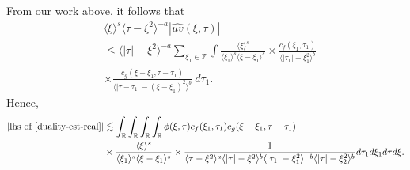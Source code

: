 \documentclass[12pt,reqno]{amsart}
\numberwithin{equation}{section}  %
\numberwithin{figure}{section}
\newcommand{\rr}{\mathbb{R}}
\newcommand{\zz}{\mathbb{Z}}
\newcommand{\wh}{\widehat}
\theoremstyle{plain}
\theoremstyle{definition}
\theoremstyle{remark}
\begin{document}
%
%
From our work above, it follows that 
%
%
\begin{equation}
	\label{convo-est-starting-pnt-real}
	\begin{split}
		 & \langle \xi \rangle^s \langle \tau - \xi^{2} \rangle^{-a} | \wh{uv}\left( 
		\xi, \tau \right) |
		\\
		& \le \langle |\tau| - \xi^{2} \rangle^{-a}
		\sum_{\xi_1 \in \zz} \int \frac{\langle \xi \rangle^{s}}{\langle \xi_1 \rangle^s
    \langle \xi - \xi_1 \rangle^s} 
		\times \frac{c_f(\xi_1, \tau_1)}{\langle |\tau_1| - \xi_1^{2} \rangle ^{b}}
		\\
		& \times
		\frac{c_g(\xi - \xi_1, \tau - \tau_1 )}{\langle |\tau - \tau_1| - (\xi - \xi_1)^{2}
    \rangle^{b}}\ d \tau_1.
	\end{split}
\end{equation}
%
%
Hence, 
%
%
\begin{equation}
  \label{pre-fubini-int-form-real}
	\begin{split}
    |\text{lhs of} \ \eqref{duality-est-real}|
    & \lesssim \int_{\rr} \int_{\rr}     \int_{\rr}  \int_{\rr} \phi(\xi, \tau)
    c_f(\xi_1, \tau_1)
		c_g(\xi - \xi_1, \tau - \tau_1 )
		\\
    & \times \frac{\langle \xi \rangle ^{s}}{\langle \xi_{1} \rangle ^{s} \langle
    \xi-\xi_{1} \rangle ^{s}} \times \frac{1}{ \langle \tau - \xi^{2} \rangle^{a}
\langle |\tau| - \xi^{2} \rangle
    ^{b}\langle |\tau_{1}|-\xi_{1}^{2} \rangle ^{-b}\langle | \tau|-\xi_{2}^{2}
    \rangle ^{b}} d \tau_1 d \xi_{1} d \tau d \xi.
	\end{split}
\end{equation}
%
\end{document}
